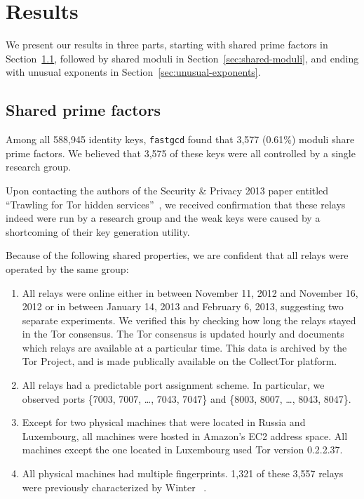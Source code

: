 \section{Results}
\label{sec:results}
We present our results in three parts, starting with shared prime factors in
Section~\ref{sec:shared-primes}, followed by shared moduli in
Section~\ref{sec:shared-moduli}, and ending with unusual exponents 
in Section~\ref{sec:unusual-exponents}.

\subsection{Shared prime factors}
\label{sec:shared-primes}
Among all 588,945 identity keys, \texttt{fastgcd} found that 3,577 (0.61\%) 
moduli share prime factors.  We believed that 3,575 of these keys 
were all controlled by a single research group.  

Upon contacting the authors of the Security \& Privacy
2013 paper entitled ``Trawling for Tor hidden services''~\cite{Biryukov2013a}, 
we received confirmation that these relays indeed were run by a research group
and the weak keys were caused by a shortcoming of their key generation utility.

Because of the following shared properties, we are confident that all relays
were operated by the same group:

\begin{enumerate}
	\item All relays were online either in between November 11, 2012 and
		November 16, 2012 or in between January 14, 2013 and February 6, 2013,
		suggesting two separate experiments. We verified this by checking how long the relays stayed in the Tor consensus. The Tor consensus is updated hourly and documents which relays are available at a particular time. This data is archived by the Tor Project, and is made publically available on the CollectTor platform.

	\item All relays had a predictable port assignment scheme.  In particular,
		we observed ports \{7003, 7007, \dots, 7043, 7047\} and \{8003, 8007,
		\dots, 8043, 8047\}.

	\item Except for two physical machines that were located in Russia and
		Luxembourg, all machines were hosted in Amazon's EC2 address space.  All
		machines except the one located in Luxembourg used Tor version
		0.2.2.37.

	\item All physical machines had multiple fingerprints.  1,321 of these 3,557 relays were previously characterized by Winter \ea~\cite[\S~5.1]{Winter2016a}.
\end{enumerate}

